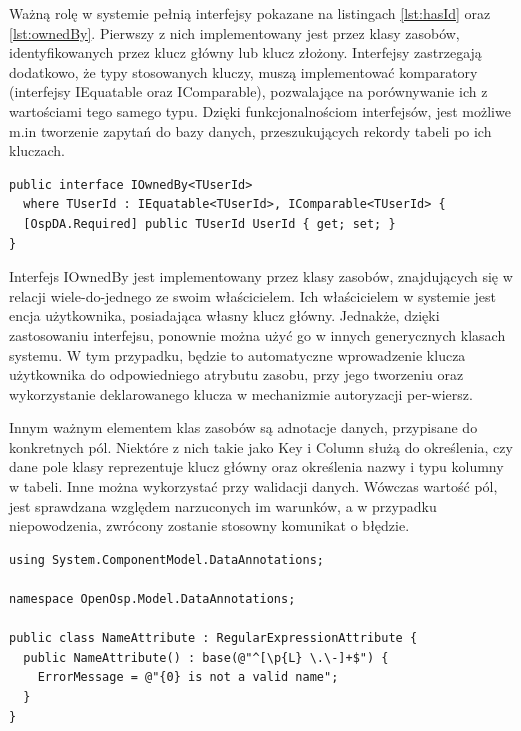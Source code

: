 Ważną rolę w systemie pełnią interfejsy pokazane na listingach \ref{lst:hasId} oraz \ref{lst:ownedBy}. Pierwszy z nich implementowany jest przez klasy zasobów, identyfikowanych przez klucz główny lub klucz złożony. Interfejsy zastrzegają dodatkowo, że typy stosowanych kluczy, muszą implementować komparatory (interfejsy IEquatable oraz IComparable), pozwalające na porównywanie ich z wartościami tego samego typu. Dzięki funkcjonalnościom interfejsów, jest możliwe m.in tworzenie zapytań do bazy danych, przeszukujących rekordy tabeli po ich kluczach.

\begin{lstlisting}[language=CSharp, caption={Interfejs implementowany przez klasy zasobów, będących w relacji wiele-do-jednego z encją ich właściciela, identyfikowanego przez klucz główny}, label=lst:ownedBy]
public interface IOwnedBy<TUserId>
  where TUserId : IEquatable<TUserId>, IComparable<TUserId> {
  [OspDA.Required] public TUserId UserId { get; set; }
}
\end{lstlisting}

Interfejs IOwnedBy jest implementowany przez klasy zasobów, znajdujących się w relacji wiele-do-jednego ze swoim właścicielem. Ich właścicielem w systemie jest encja użytkownika, posiadająca własny klucz główny. Jednakże, dzięki zastosowaniu interfejsu, ponownie można użyć go w innych generycznych klasach systemu. W tym przypadku, będzie to automatyczne wprowadzenie klucza użytkownika do odpowiedniego atrybutu zasobu, przy jego tworzeniu oraz wykorzystanie deklarowanego klucza w mechanizmie autoryzacji per-wiersz.

Innym ważnym elementem klas zasobów są adnotacje danych, przypisane do konkretnych pól. Niektóre z nich takie jako Key i Column służą do określenia, czy dane pole klasy reprezentuje klucz główny oraz określenia nazwy i typu kolumny w tabeli. Inne można wykorzystać przy walidacji danych. Wówczas wartość pól, jest sprawdzana względem narzuconych im warunków, a w przypadku niepowodzenia, zwrócony zostanie stosowny komunikat o błędzie.

\begin{lstlisting}[language=CSharp, caption=Przykładowa klasa adnotacji danych, label=lst:name_attribute]
using System.ComponentModel.DataAnnotations;

namespace OpenOsp.Model.DataAnnotations; 

public class NameAttribute : RegularExpressionAttribute {
  public NameAttribute() : base(@"^[\p{L} \.\-]+$") {
    ErrorMessage = @"{0} is not a valid name";
  }
}
\end{lstlisting}

